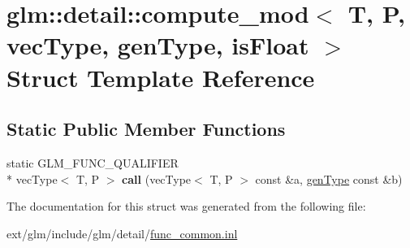 \hypertarget{structglm_1_1detail_1_1compute__mod}{\section{glm\-:\-:detail\-:\-:compute\-\_\-mod$<$ T, P, vec\-Type, gen\-Type, is\-Float $>$ Struct Template Reference}
\label{structglm_1_1detail_1_1compute__mod}
}
\subsection*{Static Public Member Functions}
\begin{DoxyCompactItemize}
\item 
\hypertarget{structglm_1_1detail_1_1compute__mod_aba5cd74efc662d8f611d71f2f5d12de1}{static G\-L\-M\-\_\-\-F\-U\-N\-C\-\_\-\-Q\-U\-A\-L\-I\-F\-I\-E\-R \\*
vec\-Type$<$ T, P $>$ {\bfseries call} (vec\-Type$<$ T, P $>$ const \&a, \hyperlink{structglm_1_1detail_1_1gen_type}{gen\-Type} const \&b)}\label{structglm_1_1detail_1_1compute__mod_aba5cd74efc662d8f611d71f2f5d12de1}

\end{DoxyCompactItemize}


The documentation for this struct was generated from the following file\-:\begin{DoxyCompactItemize}
\item 
ext/glm/include/glm/detail/\hyperlink{func__common_8inl}{func\-\_\-common.\-inl}\end{DoxyCompactItemize}
